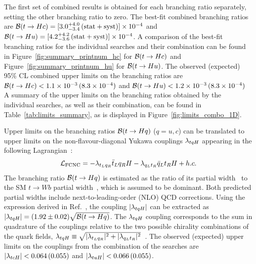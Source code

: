 
The first set of combined results is obtained for each branching ratio separately, setting the other branching ratio to zero.
The best-fit combined branching ratios are $\mathcal{B}(t\to Hc)=[3.0^{+4.0}_{-3.4}\,(\mathrm{stat+syst})] \times 10^{-4}$ and 
$\mathcal{B}(t\to Hu)=[4.2^{+4.2}_{-3.6}\,(\mathrm{stat+syst})] \times 10^{-4}$.  
A comparison of the best-fit branching ratios for the individual searches and their combination can be found in Figure~\ref{fig:summary_printnum_hc} 
for $\mathcal{B}(t\to Hc)$ and Figure~\ref{fig:summary_printnum_hu} for $\mathcal{B}(t\to Hu)$.
The observed (expected) 95\% CL combined upper limits on the branching ratios are 
$\mathcal{B}(t\to Hc)<1.1 \times 10^{-3}\,(8.3 \times 10^{-4})$ and $\mathcal{B}(t\to Hu)<1.2 \times 10^{-3}\,(8.3 \times 10^{-4})$
A summary of the upper limits on the branching ratios obtained by the individual searches, as well as their combination, 
can be found in Table~\ref{tab:limits_summary}, as is displayed in Figure~\ref{fig:limits_combo_1D}. 

Upper limits on the branching ratios $\mathcal{B}(t\to Hq)$ ($q=u,c$) can be translated to upper limits on the non-flavour-diagonal Yukawa couplings $\lambda_{tqH}$ 
appearing in the following Lagrangian~\cite{Harnik:2012pb}:
\begin{equation}
{\cal L}_{\rm FCNC} = -\lambda_{t_L q_R} \bar{t}_L q_R H - \lambda_{q_L t_R} \bar{q}_L t_R H  + h.c.
\end{equation}
The branching ratio $\mathcal{B}(t\to Hq)$ is estimated as the ratio of its partial width~\cite{Zhang:2013xya} to the SM $t \to Wb$ partial width~\cite{Denner:1990ns}, 
which is assumed to be dominant. Both predicted partial widths include next-to-leading-order (NLO) QCD corrections.
Using the expression derived in Ref.~\cite{Aad:2014dya}, the coupling $|\lambda_{tqH}|$ can be extracted as $| \lambda_{tqH} | = (1.92 \pm 0.02) \sqrt{\mathcal{B}(t\to Hq)}$.
The $\lambda_{tqH}$ coupling corresponds to the sum in quadrature of the couplings relative to the two possible chirality combinations of the quark fields, 
$\lambda_{tqH} \equiv \sqrt{ |\lambda_{t_Lq_R}|^2 +   |\lambda_{q_L t_R}|^2 }$~\cite{Harnik:2012pb}.
The observed (expected) upper limits on the couplings from the combination of the searches are $|\lambda_{tcH}|<0.064\,(0.055)$ and $|\lambda_{tuH}|<0.066\,(0.055)$.

